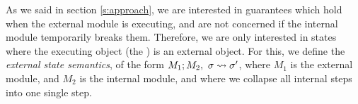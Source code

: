 As we said in section \ref{s:approach}, we are interested in guarantees which hold
when the external module is executing, and are not concerned if the internal module  temporarily
breaks them. Therefore, we are only interested in states where the
executing object (the ) is an external object. 
For this, we define the  \emph{external state semantics}, of the form 
$M_1 ; M_2,\ \sigma \leadsto \sigma'$, where $M_1$ is the external
module, and $M_2$ is the internal module, and where we
collapse all internal steps into one single step.

 


